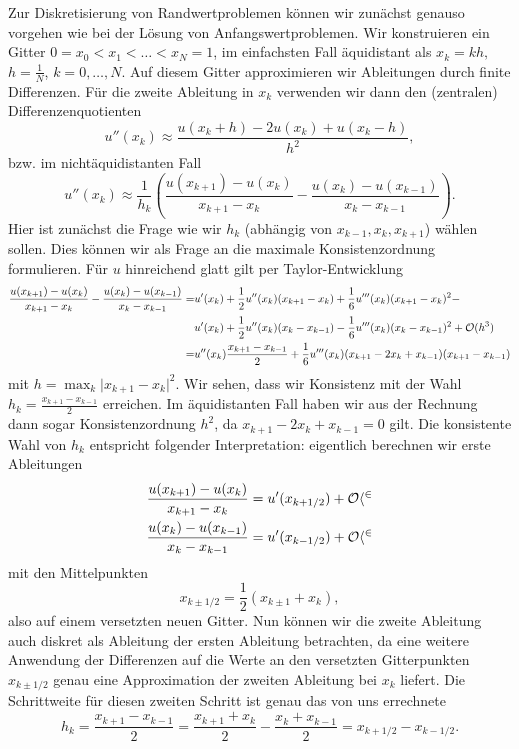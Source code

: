 Zur Diskretisierung von Randwertproblemen k\"onnen wir zun\"achst genauso vorgehen wie bei der L\"osung von Anfangswertproblemen. Wir konstruieren ein Gitter $0=x_0 < x_1 < \ldots < x_N =1$, im einfachsten Fall \"aquidistant als $x_k = kh,$ $h=\frac{1}N$, $k=0,\ldots,N$. Auf diesem Gitter approximieren wir Ableitungen durch finite Differenzen. F\"ur die zweite Ableitung in $x_k$ verwenden wir dann den (zentralen) Differenzenquotienten 
$$ u''(x_k) \approx \frac{u(x_k+h) - 2 u(x_k) + u(x_{k}-h)}{h^2}, $$
bzw. im nicht\"aquidistanten Fall
$$ u''(x_k) \approx \frac{1}{h_k} \left( \frac{u(x_{k+1}) -  u(x_k)}{x_{k+1}-x_k} -\frac{u(x_k)- u(x_{k-1})}{x_k - x_{k-1}} \right).$$
Hier ist zun\"achst die Frage wie wir $h_k$ (abh\"angig von $x_{k-1}, x_k, x_{k+1}$) w\"ahlen sollen. Dies k\"onnen wir als Frage an die maximale Konsistenzordnung formulieren. F\"ur $u$ hinreichend glatt gilt per Taylor-Entwicklung
\begin{align*}
	\frac{u(x_{k+1}) -  u(x_k)}{x_{k+1}-x_k} -\frac{u(x_k)- u(x_{k-1})}{x_k - x_{k-1}}  =& u'(x_k) + \frac{1}2 u''(x_k) (x_{k+1} -x_k)  +  \frac{1}6 u'''(x_k) (x_{k+1} -x_k)^2  - \\ &u'(x_k) + \frac{1}2 u''(x_k) (x_k-x_{k-1})  -  \frac{1}6 u'''(x_k) (x_k-x_{k-1})^2 
	+ {\cal O}(h^3)\\
	=& u''(x_k) \frac{ x_{k+1}-x_{k-1}}2 +   \frac{1}6 u'''(x_k) (x_{k+1} -2 x_k +x_{k-1})( x_{k+1}-x_{k-1} )
\end{align*}
mit $h = \max_k \vert x_{k+1} -x_k\vert^2$.
Wir sehen, dass wir Konsistenz   mit der Wahl $h_k=\frac{x_{k+1}-x_{k-1}}2$ erreichen. Im \"aquidistanten Fall haben wir aus der Rechnung dann sogar Konsistenzordnung $h^2$, da $x_{k+1} -2 x_k +x_{k-1} = 0$ gilt. Die konsistente Wahl von $h_k$ entspricht folgender Interpretation: eigentlich berechnen wir erste Ableitungen
\begin{align*}
	\frac{u(x_{k+1}) -  u(x_k)}{x_{k+1}-x_k} &= u'(x_{k+1/2}) + \cal O{h^2} \\
	\frac{u(x_k)- u(x_{k-1})}{x_k - x_{k-1}} &= u'(x_{k-1/2}) + \cal O{h^2}
\end{align*}
mit den Mittelpunkten
$$ x_{k\pm1/2} = \frac{1}2 (x_{k\pm 1} + x_k), $$
also auf einem versetzten neuen Gitter. Nun k\"onnen wir die zweite Ableitung auch diskret als Ableitung der ersten Ableitung betrachten, da eine weitere Anwendung der Differenzen auf die Werte an den versetzten Gitterpunkten $x_{k\pm1/2}$ genau eine Approximation der zweiten Ableitung bei $x_k$ liefert. Die Schrittweite f\"ur diesen zweiten Schritt ist genau das von uns errechnete 
$$h_k = \frac{x_{k+1} - x_{k-1}}2 =\frac{x_{k+1}+x_k}2 - \frac{x_k+x_{k-1}}2 = x_{k+1/2} - x_{k-1/2}.$$

